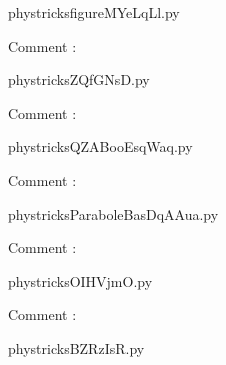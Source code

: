 
    \newcommand{\CaptionFigfigureMYeLqLl}{<+Type your caption here+>}
    \begin{center}
        
    \end{center}
    phystricksfigureMYeLqLl.py

    Comment : 

    \clearpage
    


    \newcommand{\CaptionFigZQfGNsD}{<+Type your caption here+>}
    \begin{center}
        
    \end{center}
    phystricksZQfGNsD.py

    Comment : 

    \clearpage
    


    \newcommand{\CaptionFigQZABooEsqWaq}{<+Type your caption here+>}
    \begin{center}
        
    \end{center}
    phystricksQZABooEsqWaq.py

    Comment : 

    \clearpage
    


    \newcommand{\CaptionFigParaboleBasDqAAua}{<+Type your caption here+>}
    \begin{center}
        
    \end{center}
    phystricksParaboleBasDqAAua.py

    Comment : 

    \clearpage
    


    \newcommand{\CaptionFigOIHVjmO}{<+Type your caption here+>}
    \begin{center}
        
    \end{center}
    phystricksOIHVjmO.py

    Comment : 

    \clearpage
    


    \newcommand{\CaptionFigBZRzIsR}{<+Type your caption here+>}
    \begin{center}
        
    \end{center}
    phystricksBZRzIsR.py

